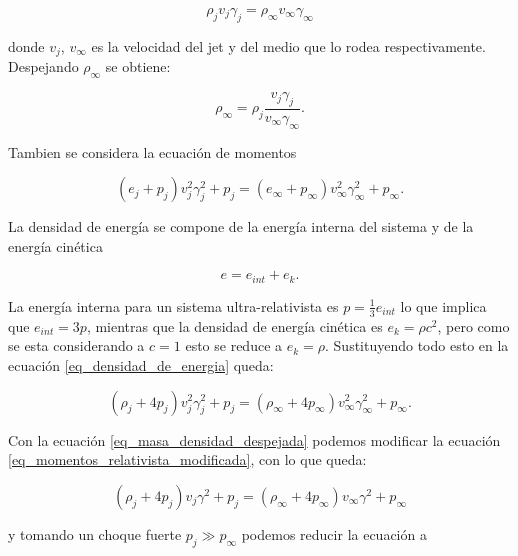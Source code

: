 \documentclass[12pt,a4paper]{book}
\begin{document}
\begin{equation}
  \rho_j v_j \gamma_j=  \rho_{\infty} v_{\infty} \gamma_{\infty}
\end{equation}

\noindent donde $v_j$, $v_\infty$ es la velocidad del jet y del medio que lo rodea respectivamente. Despejando $\rho_{\infty}$ se obtiene:

\begin{equation}\label{eq_masa_densidad_despejada}
  \rho_\infty = \rho_j \frac{v_j \gamma_j }{v_\infty \gamma_\infty}.
\end{equation}

\noindent Tambien se considera la ecuación de momentos

\begin{equation}
  \left( e_j + p_j\right) v^2_j \gamma^2_j + p_j = \left( e_{\infty} + p_{\infty}\right) v^2_{\infty} \gamma^2_{\infty} + p_{\infty}.
\end{equation}

\noindent La densidad de energía se compone de la energía interna del sistema y de la energía cinética

\begin{equation} \label{eq_densidad_de_energia}
  e = e_{int} + e_k.
\end{equation}

\noindent La energía interna para un sistema ultra-relativista es $ p = \frac{1}{3}e_{int}$ lo que implica que $e_{int} = 3p$, mientras que la densidad de energía
cinética es $e_k = \rho c^2$, pero como se esta considerando a $c = 1$ esto se reduce a $e_k = \rho$. Sustituyendo todo esto en la ecuación
\ref{eq_densidad_de_energia} queda:

\begin{equation} \label{eq_momentos_relativista_modificada}
  \left( \rho_j + 4p_j \right) v^2_j \gamma^2_j  +p_j = \left( \rho_\infty + 4p_\infty \right) v^2_{\infty} \gamma^2_{\infty}  +p_\infty.
\end{equation}

\noindent Con la ecuación \ref{eq_masa_densidad_despejada} podemos modificar la ecuación \ref{eq_momentos_relativista_modificada}, con lo que queda:

\begin{equation}
  \left( \rho_j + 4p_j \right)v_j \gamma^2 +p_j = \left( \rho_\infty + 4p_\infty \right)v_\infty \gamma^2 +p_\infty
\end{equation}

\noindent y tomando un choque fuerte $p_j \gg p_\infty $ podemos reducir la ecuación a 
\end{document}
